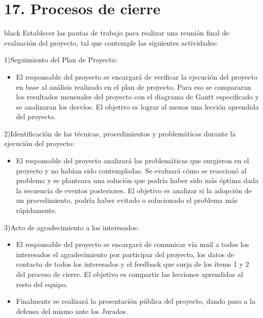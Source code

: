 \documentclass[11pt]{charter}
\begin{document}
\section{17. Procesos de cierre}    
\label{sec:cierre}

\begin{consigna}{black}
Establecer las pautas de trabajo para realizar una reunión final de evaluación del proyecto, tal que contemple las siguientes actividades:

1)Seguimiento del Plan de Proyecto:
\begin{itemize}
\item El responsable del proyecto se encargará de verificar la ejecución del proyecto en base al análisis realizado en el plan de proyecto. Para eso se compararan los resultados mensuales del proyecto con el diagrama de Gantt especificado y se analizaran los desvíos. El objetivo es lograr al menos una lección aprendida del proyecto.
\end{itemize}

2)Identificación de las técnicas, procedimientos y problemáticas durante la ejecución del proyecto:
\begin{itemize}
\item El responsable del proyecto analizará las problemáticas que surgieron en el proyecto y no habían sido contempladas. Se evaluará cómo se reaccionó al problema y se planteara una solución que podría haber sido más óptima dada la secuencia de eventos posteriores. El objetivo es analizar si la adopción de un procedimiento, podría haber evitado o solucionado el problema más rápidamente.
\end{itemize}
3)Acto de agradecimiento a los interesados:
\begin{itemize}
\item El responsable del proyecto se encargará de comunicar vía mail a todos los interesados el agradecimiento por participar del proyecto, los datos de contacto de todos los interesados y el feedback que surja de los ítems 1 y 2 del proceso de cierre. El objetivo es compartir las lecciones aprendidas al resto del equipo.

\item Finalmente se realizará la presentación pública del proyecto, dando paso a la defensa del mismo
ante los Jurados.
\end{itemize}

\end{consigna}
\end{document}
